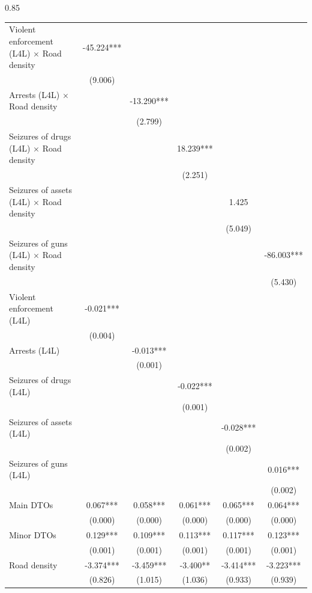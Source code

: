 \documentclass[12pt,letterpaper]{article}
\begin{document}
\begin{landscape}
\begin{center}
\begin{spacing}{0.85}
\begin{longtable}{lccccc}
Violent enforcement (L4L) $\times$ Road density & -45.224*** & & & & \\ 
 & (9.006) & & & & \\ 
Arrests (L4L) $\times$ Road density & & -13.290*** & & & \\ 
 & & (2.799) & & & \\ 
Seizures of drugs (L4L) $\times$ Road density & & & 18.239*** & & \\ 
 & & & (2.251) & & \\ 
Seizures of assets (L4L) $\times$ Road density & & & & 1.425 & \\ 
 & & & & (5.049) & \\ 
Seizures of guns (L4L) $\times$ Road density & & & & & -86.003*** \\ 
 & & & & & (5.430) \\ 
 
Violent enforcement (L4L) & -0.021*** & & & & \\ 
 & (0.004) & & & & \\ 
Arrests (L4L) & & -0.013*** & & & \\ 
 & & (0.001) & & & \\ 
Seizures of drugs (L4L) & & & -0.022*** & & \\ 
 & & & (0.001) & & \\ 
Seizures of assets (L4L) & & & & -0.028*** & \\ 
 & & & & (0.002) & \\ 
Seizures of guns (L4L) & & & & & 0.016*** \\ 
 & & & & & (0.002) \\ 
 
Main DTOs & 0.067*** & 0.058*** & 0.061*** & 0.065*** & 0.064*** \\ 
 & (0.000) & (0.000) & (0.000) & (0.000) & (0.000) \\ 
Minor DTOs & 0.129*** & 0.109*** & 0.113*** & 0.117*** & 0.123*** \\ 
 & (0.001) & (0.001) & (0.001) & (0.001) & (0.001) \\ 
Road density & -3.374*** & -3.459*** & -3.400** & -3.414*** & -3.223*** \\ 
 & (0.826) & (1.015) & (1.036) & (0.933) & (0.939) \\ 
 

\end{longtable}
\end{spacing}
\end{center}
\end{landscape}
\end{document}
